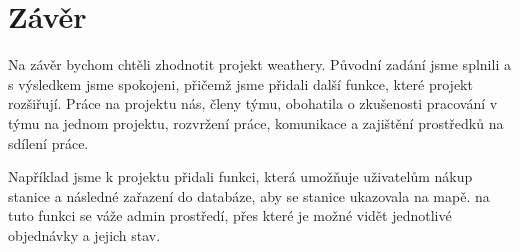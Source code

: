 \section{Závěr}
Na závěr bychom chtěli zhodnotit projekt weathery. Původní zadání jsme splnili a s výsledkem jsme spokojeni, přičemž jsme přidali další funkce, které projekt rozšiřují.
Práce na projektu nás, členy týmu, obohatila o zkušenosti pracování v týmu na jednom projektu, rozvržení práce, komunikace a zajištění prostředků na sdílení práce.

Například jsme k projektu přidali funkci, která umožňuje uživatelům nákup stanice a následné zařazení do databáze, aby se stanice ukazovala na mapě.
na tuto funkci se váže admin prostředí, přes které je možné vidět jednotlivé objednávky a jejich stav.
